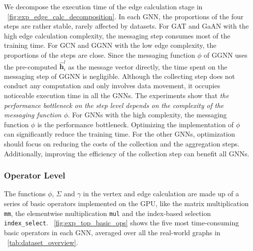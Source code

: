 We decompose the execution time of the edge calculation stage in \figurename~\ref{fig:exp_edge_calc_decomposition}.
In each GNN, the proportions of the four steps are rather stable, rarely affected by datasets. 
For GAT and GaAN with the high edge calculation complexity, the messaging step consumes most of the training time. 
For GCN and GGNN with the low edge complexity, the proportions of the steps are close. 
Since the messaging function $\phi$ of GGNN uses the pre-computed $\hat{\boldsymbol{h}}^l_i$ as the message vector directly, the time spent on the messaging step of GGNN is negligible.
Although the collecting step does not conduct any computation and only involves data movement, it occupies noticeable execution time in all the GNNs.
The experiments show that \emph{the performance bottleneck on the step level depends on the complexity of the messaging function $\phi$}.
For GNNs with the high complexity, the messaging function $\phi$ is the performance bottleneck.
Optimizing the implementation of $\phi$ can significantly reduce the training time.
For the other GNNs, optimization should focus on reducing the costs of the collection and the aggregation steps.
Additionally, improving the efficiency of the collection step can benefit all GNNs.

\subsubsection{Operator Level}

The functions $\phi$, $\Sigma$ and $\gamma$ in the vertex and edge calculation are made up of a series of basic operators implemented on the GPU, like the matrix multiplication \texttt{mm}, the elementwise multiplication \texttt{mul} and the index-based selection \texttt{index\_select}.
\figurename~\ref{fig:exp_top_basic_ops} shows the five most time-consuming basic operators in each GNN, averaged over all the real-world graphs in \tablename~\ref{tab:dataset_overview}.

